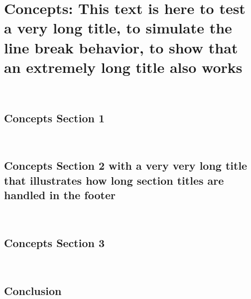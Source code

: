 %
\chapter{Concepts: This text is here to test a very long title, to simulate the line break behavior, to show that an extremely long title also works}
~\label{sec:concepts}




\section{Concepts Section 1}
~\label{sec:concepts:sec1}



\section{Concepts Section 2 with a very very long title that illustrates how long section titles are handled in the footer}
~\label{sec:concepts:sec2}



\section{Concepts Section 3}
~\label{sec:concepts:sec3}



\section{Conclusion}
~\label{sec:concepts:conclusion}


